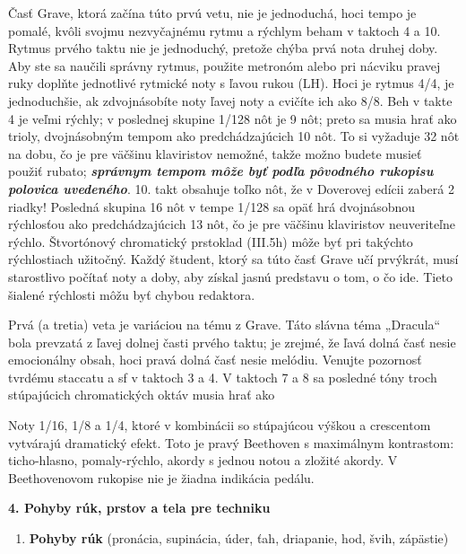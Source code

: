 \documentclass[11pt,a4paper%
]{book}
\begin{document}
Časť Grave, ktorá začína túto prvú vetu, nie je jednoduchá, hoci tempo je pomalé, kvôli svojmu nezvyčajnému rytmu a rýchlym beham v taktoch 4 a 10. Rytmus prvého taktu nie je jednoduchý, pretože chýba prvá nota druhej doby. Aby ste sa naučili správny rytmus, použite metronóm alebo pri nácviku pravej ruky doplňte jednotlivé rytmické noty s ľavou rukou (LH). Hoci je rytmus 4/4, je jednoduchšie, ak zdvojnásobíte noty ľavej noty a cvičíte ich ako 8/8. Beh v takte 4 je veľmi rýchly; v poslednej skupine 1/128 nôt je 9 nôt; preto sa musia hrať ako trioly, dvojnásobným tempom ako predchádzajúcich 10 nôt. To si vyžaduje 32 nôt na dobu, čo je pre väčšinu klaviristov nemožné, takže možno budete musieť použiť rubato; \emph{\textbf{správnym tempom môže byť podľa pôvodného rukopisu polovica uvedeného}}. 10. takt obsahuje toľko nôt, že v Doverovej edícii zaberá 2 riadky! Posledná skupina 16 nôt v tempe 1/128 sa opäť hrá dvojnásobnou rýchlosťou ako predchádzajúcich 13 nôt, čo je pre väčšinu klaviristov neuveriteľne rýchlo. Štvortónový chromatický prstoklad (III.5h) môže byť pri takýchto rýchlostiach užitočný. Každý študent, ktorý sa túto časť Grave učí prvýkrát, musí starostlivo počítať noty a doby, aby získal jasnú predstavu o tom, o čo ide. Tieto šialené rýchlosti môžu byť chybou redaktora.

Prvá (a tretia) veta je variáciou na tému z Grave. Táto slávna téma „Dracula`` bola prevzatá z ľavej dolnej časti prvého taktu; je zrejmé, že ľavá dolná časť nesie emocionálny obsah, hoci pravá dolná časť nesie melódiu. Venujte pozornosť tvrdému staccatu a sf v taktoch 3 a 4. V taktoch 7 a 8 sa posledné tóny troch stúpajúcich chromatických oktáv musia hrať ako

Noty 1/16, 1/8 a 1/4, ktoré v kombinácii so stúpajúcou výškou a crescentom vytvárajú dramatický efekt. Toto je pravý Beethoven s maximálnym kontrastom: ticho-hlasno, pomaly-rýchlo, akordy s jednou notou a zložité akordy. V Beethovenovom rukopise nie je žiadna indikácia pedálu.

\textbf{4. Pohyby rúk, prstov a tela pre techniku}

\begin{enumerate}
\def\labelenumi{\alph{enumi}.}
\item
  \textbf{Pohyby rúk} (pronácia, supinácia, úder, ťah, driapanie, hod, švih, zápästie)
\end{enumerate}
\end{document}
